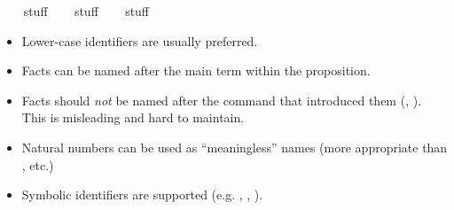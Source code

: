 \begin{isabellebody}
\ \ \isamarkupfalse%
\ stuff{}{}{}\isanewline
\ \ \isamarkupfalse%
\ stuff{}{}{}{}{}\isanewline
\ \ \isamarkupfalse%
\ stuff{}{}{}{}%
\endisatagproof
{\isafoldproof}%
%
\isadelimproof
\isanewline
%
\endisadelimproof
{}\isamarkupfalse%
%
\isamarkuptrue%
%
\begin{isamarkuptext}%
\begin{itemize}

  \item Lower-case identifiers are usually preferred.

  \item Facts can be named after the main term within the proposition.

  \item Facts should \emph{not} be named after the command that
  introduced them (\hyperlink{command.assume}{\mbox{}}, \hyperlink{command.have}{\mbox{}}).  This is
  misleading and hard to maintain.

  \item Natural numbers can be used as ``meaningless'' names (more
  appropriate than ,  etc.)

  \item Symbolic identifiers are supported (e.g. , , ).


\end{itemize}
\end{isamarkuptext}
\end{isabellebody}
